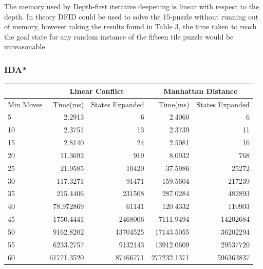 \documentclass[final]{cmpreport}
\begin{document}
The memory used by Depth-first iterative deepening is linear with respect to the depth. In theory DFID could be used to solve the 15-puzzle without running out of memory, however taking the results found in Table 3, the time taken to reach the goal state for any random instance of the fifteen tile puzzle would be unreasonable.


\subsubsection{IDA*}

\begin{center}
	
	\begin{tabular}{|l|r|r|r|r|} \cline{2-5}
		
		\multicolumn{1}{c}{} & \multicolumn{2}{|c|}{Linear Conflict} &
		\multicolumn{2}{|c|}{Manhattan Distance} \\ \hline
		Min Moves & Time(ms) & States Expanded & Time(ms) & States Expanded \\	\hline \hline
		5  & 2.2913 & 6                        & 2.4060       &          6            \\
		10 & 2.3751  & 13                      & 2.3739       &         11            \\
		15 & 2.8140 & 24                       & 2.5081          &      16            \\
		20 & 11.3692 & 919                     & 8.0932        &        768           \\
		25&  21.9585  & 10420                  & 37.5986        &       25272         \\
		30& 117.3271 & 91471                   & 159.5604        &      217239        \\
		35  & 215.4406 & 231508                & 287.0284        &      482893        \\
		40& 78.972869 & 61141                  & 120.4332          &    110903        \\
		45 & 1750.4441 & 2468006               & 7111.9494        &     14202684      \\
		50& 9162.8202 & 13704525               & 17143.5055         &   36202294       \\
		55 & 6233.2757 & 9132143               & 13912.0609        &    29537720       \\
		60 & 61771.3520 & 87466771             & 277232.1371      &     596363837      \\
		\hline
		
	\end{tabular}
	
\end{center}
\end{document}
